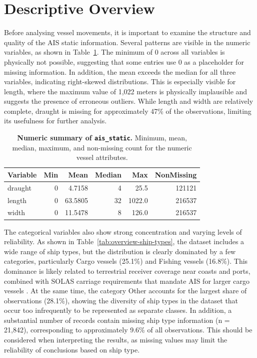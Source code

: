 \documentclass[10pt,a4paper]{article}
\begin{document}

\section {Descriptive Overview}

Before analysing vessel movements, it is important to examine the structure and quality of the AIS static information.
Several patterns are visible in the numeric variables, as shown in Table~\ref{tab:numeric-summary}. The minimum of 0 across all variables is physically not possible,
suggesting that some entries use 0 as a placeholder for missing information. In addition, the mean exceeds the median for 
all three variables, indicating right-skewed distributions. This is especially visible for length, where the maximum value of 
1,022 meters is physically implausible and suggests the presence of erroneous outliers. While length and width are relatively 
complete, draught is missing for approximately 47\% of the observations, limiting its usefulness for further analysis.

\begin{table}[ht]
\caption{\textbf{Numeric summary of \texttt{ais\_static}.} Minimum, mean, median, maximum, and non-missing count for the numeric vessel attributes.}
\label{tab:numeric-summary}
\vspace{0.2cm}
\centering
\small
\begin{tabular}{@{}lrrrrr@{}}
\toprule
{\bfseries Variable} & {\bfseries Min} & {\bfseries Mean} & {\bfseries Median} & {\bfseries Max} & {\bfseries NonMissing} \\
\midrule
draught & 0 & 4.7158  &  4 &   25.5 & 121121 \\
length  & 0 & 63.5805 & 32 & 1022.0 & 216537 \\
width   & 0 & 11.5478 &  8 &  126.0 & 216537 \\
\bottomrule
\end{tabular}
\end{table}

The categorical variables also show strong concentration and varying levels of reliability. As shown in Table~\ref{tab:overview-ship-types}, the dataset includes
a wide range of ship types, but the distribution is clearly dominated by a few categories, particularly Cargo vessels (25.1\%) and Fishing vessels (16.8\%).
This dominance is likely related to terrestrial receiver coverage near coasts and ports, combined with SOLAS carriage requirements that mandate AIS for 
larger cargo vessels \cite{3}. At the same time, the category Other accounts for the largest share of observations (28.1\%), showing the diversity of ship types in 
the dataset that occur too infrequently to be represented as separate classes. In addition, a substantial number of records contain missing ship type 
information (n = 21,842), corresponding to approximately 9.6\% of all observations. This should be considered when interpreting the results, as missing 
values may limit the reliability of conclusions based on ship type.
\end{document}
